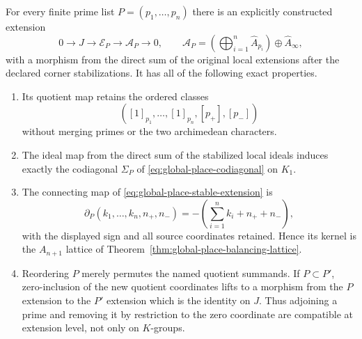 \begin{theorem}
\label{thm:global-place-stable-extension}
For every finite prime list $P=(p_1,\ldots,p_n)$ there is an explicitly
constructed extension
\begin{equation}
 0\longrightarrow J\longrightarrow\mathcal E_P
 \longrightarrow\mathcal A_P\longrightarrow0,
 \qquad
 \mathcal A_P=
 \left(\bigoplus_{i=1}^{n}\widehat A_{p_i}\right)
 \oplus\widehat A_\infty,
 \label{eq:global-place-stable-extension}
\end{equation}
with a morphism from the direct sum of the original local extensions after the
declared corner stabilizations.  It has all of the following exact properties.
\begin{enumerate}
\item Its quotient map retains the ordered classes
\[
 ([1]_{p_1},\ldots,[1]_{p_n},[p_+],[p_-])
\]
without merging primes or the two archimedean characters.
\item The ideal map from the direct sum of the stabilized local ideals induces
exactly the codiagonal $\Sigma_P$ of
\eqref{eq:global-place-codiagonal} on $K_1$.
\item The connecting map of \eqref{eq:global-place-stable-extension} is
\[
 \partial_P(k_1,\ldots,k_n,n_+,n_-)
 =-\left(\sum_{i=1}^{n}k_i+n_++n_-\right),
\]
with the displayed sign and all source coordinates retained.  Hence its kernel
is the $A_{n+1}$ lattice of
Theorem~\ref{thm:global-place-balancing-lattice}.
\item Reordering $P$ merely permutes the named quotient summands.  If
$P\subset P'$, zero-inclusion of the new quotient coordinates lifts to a
morphism from the $P$ extension to the $P'$ extension which is the identity on
$J$.  Thus adjoining a prime and removing it by restriction to the zero
coordinate are compatible at extension level, not only on $K$-groups.
\end{enumerate}
\end{theorem}

